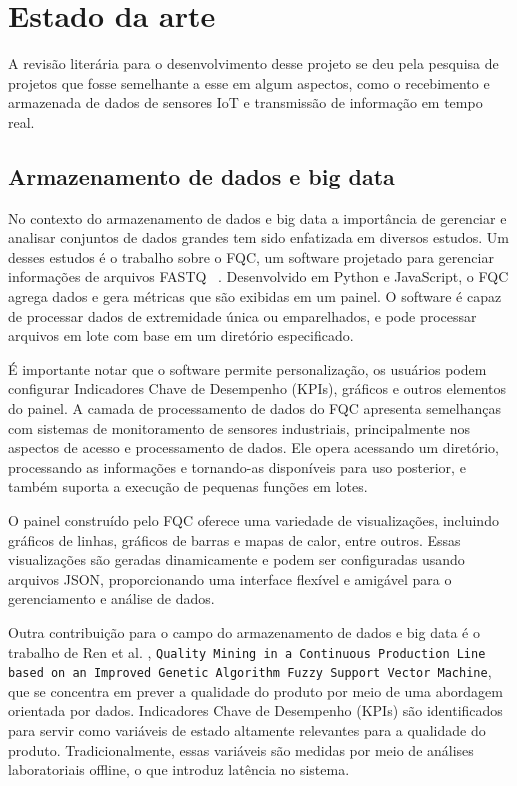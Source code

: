 \chapter{Estado da arte}\label{cap:conceptual}
A revisão literária para o desenvolvimento desse projeto se deu pela pesquisa de projetos que fosse semelhante a esse em algum aspectos, como o recebimento e armazenada de dados de sensores IoT e transmissão de informação em tempo real.

\section{Armazenamento de dados e big data}

No contexto do armazenamento de dados e big data a importância de gerenciar e analisar conjuntos de dados grandes tem sido enfatizada em diversos estudos. Um desses estudos é o trabalho sobre o FQC, um software projetado para gerenciar informações de arquivos FASTQ ~\cite{fqc2017}. Desenvolvido em Python e JavaScript, o FQC agrega dados e gera métricas que são exibidas em um painel. O software é capaz de processar dados de extremidade única ou emparelhados, e pode processar arquivos em lote com base em um diretório especificado.

É importante notar que o software permite personalização, os usuários podem configurar Indicadores Chave de Desempenho (KPIs), gráficos e outros elementos do painel. A camada de processamento de dados do FQC apresenta semelhanças com sistemas de monitoramento de sensores industriais, principalmente nos aspectos de acesso e processamento de dados. Ele opera acessando um diretório, processando as informações e tornando-as disponíveis para uso posterior, e também suporta a execução de pequenas funções em lotes.

O painel construído pelo FQC oferece uma variedade de visualizações, incluindo gráficos de linhas, gráficos de barras e mapas de calor, entre outros. Essas visualizações são geradas dinamicamente e podem ser configuradas usando arquivos JSON, proporcionando uma interface flexível e amigável para o gerenciamento e análise de dados.

Outra contribuição para o campo do armazenamento de dados e big data é o trabalho de Ren et al. \cite{ren2021data}, \texttt{Quality Mining in a Continuous Production Line based on an Improved Genetic Algorithm Fuzzy Support Vector Machine}, que se concentra em prever a qualidade do produto por meio de uma abordagem orientada por dados. Indicadores Chave de Desempenho (KPIs) são identificados para servir como variáveis de estado altamente relevantes para a qualidade do produto. Tradicionalmente, essas variáveis são medidas por meio de análises laboratoriais offline, o que introduz latência no sistema.

